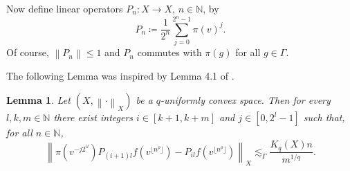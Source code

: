 \documentclass[11pt,reqno]{amsart}
\newtheorem{lemma}[theorem]{Lemma}
\newcommand{\1}{\mathbf 1}
\begin{document}
Now define linear operators $P_n:X\to X$, $n\in \mathbb{N}$, by
\[
P_n\coloneqq \frac{1}{2^n}\sum_{j=0}^{2^n-1}\pi\left(v\right)^j.
\]
Of course, $\left\|P_n\right\|\le 1$ and $P_n$ commutes with $\pi\left(g\right)$ for all $g\in \Gamma$.

The following Lemma was inspired by Lemma 4.1 of \cite{austin2013sharp}.
\begin{lemma}\label{L1}
Let $\left(X,\left\|\cdot\right\|_X\right)$ be a $q$-uniformly convex space. Then for every $l,k,m\in \mathbb{N}$ there exist integers $i\in \left[k+1,k+m\right]$ and $j\in \left[0,2^l-1\right]$ such that, for all $n\in \mathbb{N}$,
\begin{equation}
\left\|\pi\left(v^{-j2^{il}}\right)P_{\left(i+1\right)l}f\left(v^{\lfloor n^\rho\rfloor}\right)-P_{il}f\left(v^{\lfloor n^\rho\rfloor}\right)\right\|_X\lesssim_\Gamma \frac{K_q\left(X\right)n}{m^{1/q}}.
\end{equation}
\end{lemma}
\end{document}
